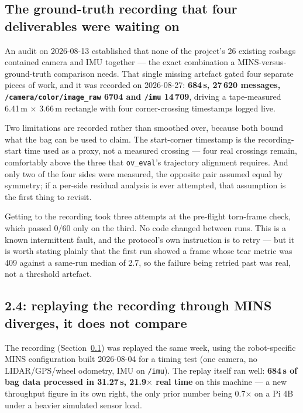\documentclass[11pt]{article}
\begin{document}
\subsection{The ground-truth recording that four deliverables were waiting
on}
\label{sec:bag23}

An audit on 2026-08-13 established that none of the project's 26 existing
rosbags contained camera and IMU together --- the exact combination a
MINS-versus-ground-truth comparison needs. That single missing artefact
gated four separate pieces of work, and it was recorded on 2026-08-27:
\textbf{684\,s, 27\,620 messages, \texttt{/camera/color/image\_raw} 6704 and
\texttt{/imu} 14\,709}, driving a tape-measured 6.41\,m $\times$ 3.66\,m
rectangle with four corner-crossing timestamps logged live.

Two limitations are recorded rather than smoothed over, because both bound
what the bag can be used to claim. The start-corner timestamp is the
recording-start time used as a proxy, not a measured crossing --- four real
crossings remain, comfortably above the three that
\texttt{ov\_eval}'s trajectory alignment requires. And only two of the four
sides were measured, the opposite pair assumed equal by symmetry; if a
per-side residual analysis is ever attempted, that assumption is the first
thing to revisit.

Getting to the recording took three attempts at the pre-flight torn-frame
check, which passed 0/60 only on the third. No code changed between runs.
This is a known intermittent fault, and the protocol's own instruction is to
retry --- but it is worth stating plainly that the first run showed a frame
whose tear metric was 409 against a same-run median of 2.7, so the failure
being retried past was real, not a threshold artefact.

\subsection{2.4: replaying the recording through MINS diverges, it does not
compare}
\label{sec:24divergence}

The recording (Section~\ref{sec:bag23}) was replayed the same week, using the
robot-specific MINS configuration built 2026-08-04 for a timing test (one
camera, no LIDAR/GPS/wheel odometry, IMU on \texttt{/imu}). The replay itself
ran well: \textbf{684\,s of bag data processed in 31.27\,s, 21.9$\times$ real
time} on this machine --- a new throughput figure in its own right, the only
prior number being 0.7$\times$ on a Pi 4B under a heavier simulated sensor
load.
\end{document}
